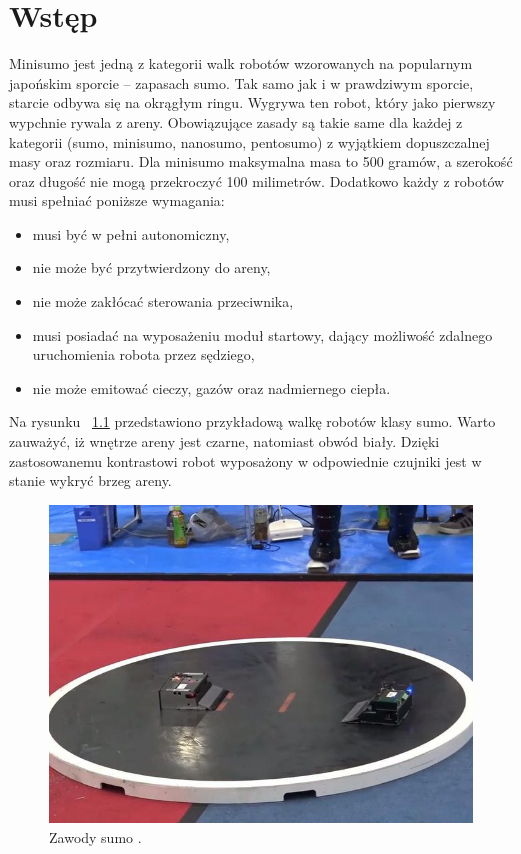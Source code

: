 \chapter{Wstęp}
Minisumo jest jedną z kategorii walk robotów wzorowanych na popularnym japońskim sporcie – zapasach sumo. Tak samo jak i w prawdziwym sporcie, starcie odbywa się na okrągłym ringu. Wygrywa ten robot, który jako pierwszy wypchnie rywala z areny. Obowiązujące zasady są takie same dla każdej z kategorii (sumo, minisumo, nanosumo, pentosumo) z wyjątkiem dopuszczalnej masy oraz rozmiaru. Dla minisumo maksymalna masa to 500 gramów, a szerokość oraz długość nie mogą przekroczyć 100 milimetrów. Dodatkowo każdy z robotów musi spełniać 
poniższe wymagania:
\begin{itemize}
\item musi być w pełni autonomiczny,
\item nie może być przytwierdzony do areny,
\item nie może zakłócać sterowania przeciwnika,
\item musi posiadać na wyposażeniu moduł startowy, dający możliwość zdalnego uruchomienia robota przez sędziego,
\item nie może emitować cieczy, gazów oraz nadmiernego ciepła.
\end{itemize}

Na rysunku ~\ref{fig:sumo_competitions} przedstawiono przykładową walkę robotów klasy sumo. Warto zauważyć, iż  wnętrze areny jest czarne, natomiast obwód biały. Dzięki zastosowanemu kontrastowi robot wyposażony w odpowiednie czujniki jest w stanie wykryć brzeg areny.

\begin{figure}[H]
	\centering
		\includegraphics[width=0.5\linewidth]{pic01/sumo_competitions.jpg}
	\caption{Zawody sumo \cite{Sumo}.}
	\label{fig:sumo_competitions}	
\end{figure}

